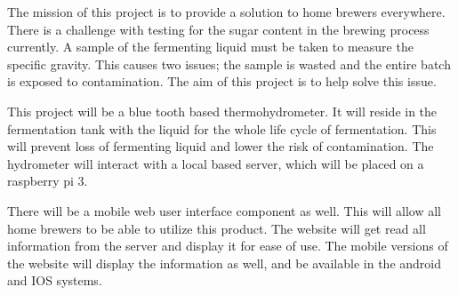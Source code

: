 The mission of this project is to provide a solution to home brewers everywhere.  There is a challenge with testing for the sugar content in the brewing process currently.  A sample of the fermenting liquid must be taken to measure the specific gravity.  This causes two issues; the sample is wasted and the entire batch is exposed to contamination.  The aim of this project is to help solve this issue.

This project will be a blue tooth based thermohydrometer.  It will reside in the fermentation tank with the liquid for the whole life cycle of fermentation.  This will prevent loss of fermenting liquid and lower the risk of contamination.  The hydrometer will interact with a local based server, which will be placed on a raspberry pi 3.

There will be a mobile web user interface component as well.  This will allow all home brewers to be able to utilize this product.  The website will get read all information from the server and display it for ease of use.  The mobile versions of the website will display the information as well, and be available in the android and IOS systems.